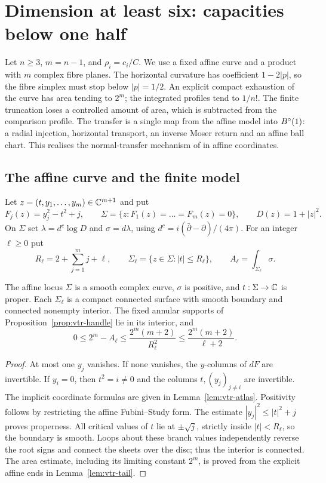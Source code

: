 \section{Dimension at least six: capacities below one half}\label{sec:qdr}

Let $n\ge3$, $m=n-1$, and $\rho_i=c_i/C$. We use a fixed affine curve and a product with $m$ complex fibre planes.
The horizontal curvature has coefficient $1-2|p|$, so the fibre simplex must stop below $|p|=1/2$.
An explicit compact exhaustion of the curve has area tending to $2^m$; the integrated profiles tend to $1/n!$.
The finite truncation loses a controlled amount of area, which is subtracted from the comparison profile.
The transfer is a single map from the affine model into $B^{\circ}(1)$: a radial injection, horizontal transport, an inverse
Moser return and an affine ball chart. This realises the normal-transfer mechanism of \cite{OpenAI2026} in affine
coordinates.

\subsection{The affine curve and the finite model}

\begin{definition}\label{def:qdr-curve}
Let $z=(t,y_1,\dots,y_m)\in\mathbb{C}^{m+1}$ and put
\[
 F_j(z)=y_j^2-t^2+j,\qquad
 \Sigma=\{z:F_1(z)=\dots=F_m(z)=0\},\qquad
 D(z)=1+|z|^2.
\]
On $\Sigma$ set $\lambda=d^c\log D$ and $\sigma=d\lambda$, using
$d^c=i(\bar\partial-\partial)/(4\pi)$. For an integer $\ell\ge0$ put
\[
 R_\ell=2+\sum_{j=1}^m j+\ell,\qquad \Sigma_\ell=\{z\in\Sigma:|t|\le R_\ell\},\qquad
 A_\ell=\int_{\Sigma_\ell}\sigma.
\]
\end{definition}

\begin{lemma}\label{lem:qdr-curve}
The affine locus $\Sigma$ is a smooth complex curve, $\sigma$ is positive, and $t:\Sigma\to\mathbb{C}$ is proper.
Each $\Sigma_\ell$ is a compact connected surface with smooth boundary and connected nonempty interior.
The fixed annular supports of Proposition~\ref{prop:vtr-handle} lie in its interior, and
\[
 0\le2^m-A_\ell\le\frac{2^m(m+2)}{R_\ell^2}\le\frac{2^m(m+2)}{\ell+2}.
\]
\end{lemma}

\begin{proof}
At most one $y_j$ vanishes. If none vanishes, the $y$-columns of $dF$ are invertible.
If $y_i=0$, then $t^2=i\ne0$ and the columns $t,(y_j)_{j\ne i}$ are invertible.
The implicit coordinate formulas are given in Lemma~\ref{lem:vtr-atlas}.
Positivity follows by restricting the affine Fubini--Study form.
The estimate $|y_j|^2\le|t|^2+j$ proves properness. All critical values of $t$ lie at $\pm\sqrt j$,
strictly inside $|t|<R_\ell$, so the boundary is smooth.
Loops about these branch values independently reverse the root signs and connect the sheets over the disc;
thus the interior is connected. The area estimate, including its limiting constant $2^m$, is proved from the
explicit affine ends in Lemma~\ref{lem:vtr-tail}.
\end{proof}

